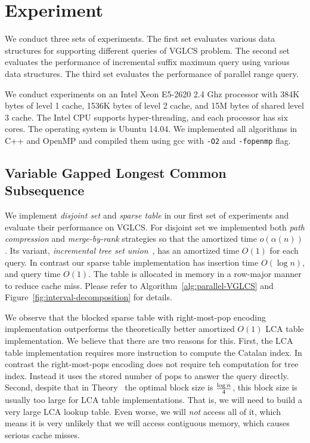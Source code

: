 \section{Experiment} \label{sec:Experiment}

We conduct three sets of experiments.  The first set evaluates various
data structures for supporting different queries of VGLCS problem.
The second set evaluates the performance of incremental suffix maximum
query using various data structures.  The third set evaluates the
performance of parallel range query.

We conduct experiments on an Intel Xeon E5-2620 2.4 Ghz processor with
384K bytes of level 1 cache, 1536K bytes of level 2 cache, and 15M
bytes of shared level 3 cache.  The Intel CPU supports
hyper-threading, and each processor has six cores.  The operating
system is Ubuntu 14.04.  We implemented all algorithms in C++ and
OpenMP and compiled them using gcc with {\tt -O2} and {\tt -fopenmp}
flag.

\subsection{Variable Gapped Longest Common Subsequence}

We implement {\em disjoint set} and {\em sparse table} in our first
set of experiments and evaluate their performance on VGLCS.  For
disjoint set we implemented both {\em path compression} and {\em
  merge-by-rank} strategies so that the amortized time $o(\alpha(n))$.
Its variant, {\em incremental tree set union}~\cite{Gabow1983ALA}, has
an amortized time $O(1)$ for each query.  In contrast our sparse table
implementation has insertion time $O(\log n)$, and query time $O(1)$.
The table is allocated in memory in a row-major manner to reduce cache
miss.  Please refer to Algorithm~\ref{alg:parallel-VGLCS} and
Figure~\ref{fig:interval-decomposition} for details.

We observe that the blocked sparse table with right-most-pop encoding
implementation outperforms the theoretically better amortized $O(1)$
LCA table implementation.  We believe that there are two reasons for
this.  First, the LCA table implementation requires more instruction
to compute the Catalan index.  In contrast the right-most-pops
encoding does not require teh computation for tree index.  Instead it
uses the stored number of pops to answer the query directly.  Second,
despite that in Theory~\cite{Fischer2006TheoreticalAP} the optimal
block size is ${\log n}\over{4}$, this block size is usually too large
for LCA table implementations.  That is, we will need to build a very
large LCA lookup table.  Even worse, we will {\em not} access all of
it, which means it is very unlikely that we will access contiguous
memory, which causes serious cache misses.

